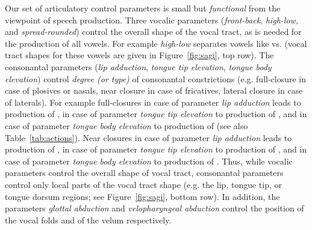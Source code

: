 \documentclass[conference]{IEEEtran}
\let\ipa\textipa
\begin{document}
Our set of articulatory control parameters is small but
\textit{functional} from the viewpoint of speech production. Three
vocalic parameters (\textit{front-back}, \textit{high-low}, and
\textit{spread-rounded}) control the overall shape of the vocal tract,
as is needed for the production of all vowels. For example \textit{high-low} separates
vowels like \ipa{[i, y, u]} vs. \ipa{[A]} (vocal tract shapes for these vowels are given in
Figure~\ref{fig:sagi}, top row). The consonantal parameters (\textit{lip
  adduction}, \textit{tongue tip elevation}, \textit{tongue body
  elevation}) control \textit{degree (or type)} of consonantal
constrictions (e.g. full-closure in case of plosives or nasals, near
closure in case of fricatives, lateral closure in case of laterals).
For example full-closures in case of parameter \textit{lip adduction}
leads to production of \ipa{[p, b, m]}, in case of parameter
\textit{tongue tip elevation} to production of \ipa{[d, t, n]}, and in case of
parameter \textit{tongue body elevation} to production of \ipa{[k, g]}
(see also Table~\ref{tab:actions}). Near closures in case of parameter
\textit{lip adduction} leads to production of \ipa{[f]}, in case of parameter
\textit{tongue tip elevation} to production of \ipa{[s, z, S, Z]}, and in case of
parameter \textit{tongue body elevation} to production of \ipa{[x]}.
Thus, while vocalic parameters control the overall shape of vocal tract,
consonantal parameters control only local parts
of the vocal tract shape (e.g. the lip, tongue tip, or tongue
dorsum regions; see Figure~\ref{fig:sagi}, bottom row). In addition, the
parameters \textit{glottal abduction} and \textit{velopharyngeal
  abduction} control the position of the vocal folds
and of the velum respectively.
\end{document}
